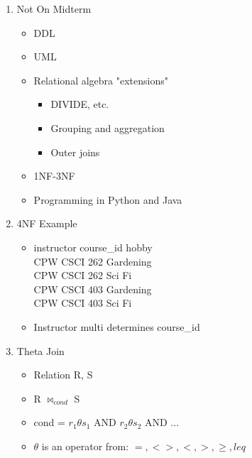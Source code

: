 \documentclass[12pt]{article}
\begin{document}
\begin{enumerate}
		\item
			Not On Midterm
		\begin{itemize}
			\item
				DDL
			\item
				UML
			\item
				Relational algebra "extensions"
				\begin{itemize}
					\item
						DIVIDE, etc.
					\item
						Grouping and aggregation
					\item
						Outer joins
				\end{itemize}
			\item
				1NF-3NF
			\item
				Programming in Python and Java
		\end{itemize}
		

	\item
		4NF Example
		\begin{itemize}
			\item
				instructor	course\_id		hobby \\
				CPW		CSCI 262		Gardening \\
				CPW		CSCI 262		Sci Fi \\
				CPW		CSCI 403		Gardening \\
				CPW		CSCI 403		Sci Fi
			\item
				Instructor multi determines course\_id
		\end{itemize}
	\item
		Theta Join
		\begin{itemize}
			\item
				Relation R, S
			\item
				R $\bowtie_{cond}$ S
			\item
				cond = $r_1 \theta s_1$ AND $r_2 \theta s_2$ AND ...
			\item
				$\theta$ is an operator from: {$=, <>, <, >, \geq, leq$}
		\end{itemize}
	\end{enumerate}
\end{document}
